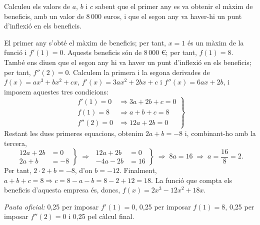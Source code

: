 \begin{apartats}
Calculeu els valors de $a$, $b$ i $c$ sabent que el primer any es va obtenir el màxim de beneficis, amb un
valor de 8\,000 euros, i que el segon any va haver-hi un punt d'inflexió en els beneficis.

\begin{solucio}
El primer any s'obté el màxim de beneficis; per tant, $x=1$ és un màxim de la funció i $f'(1)=0$. Aquests
beneficis són de 8\,000 €; per tant, $f(1)=8$. També ens diuen que el segon any hi va haver un punt d'inflexió
en els beneficis; per tant, $f''(2)=0$. Calculem la primera i la segona derivades de $f(x)=ax^3+bx^2+cx$,
$f'(x)=3ax^2+2bx+c$ i $f''(x)=6ax+2b$, i imposem aquestes tres condicions:
\[
\left.\begin{aligned}f'(1)=0&\Rightarrow3a+2b+c=0\\f(1)=8&\Rightarrow a+b+c=8\\f''(2)=0&\Rightarrow12a+2b=0\end{aligned}\right\}
\]
Restant les dues primeres equacions, obtenim $2a+b=-8$ i, combinant-ho amb la tercera,
\[
\left.\begin{aligned}12a+2b&=0\\2a+b&=-8\end{aligned}\right\}\;\Rightarrow\;
\left.\begin{aligned}12a+2b&=0\\-4a-2b&=16\end{aligned}\right\}\;\Rightarrow\;8a=16\;\Rightarrow\;a=\frac{16}{8}=2 .
\]
Per tant, $2\cdot2+b=-8$, d'on $b=-12$. Finalment, $a+b+c=8\Rightarrow c=8-a-b=8-2+12=18$. La funció que
compta els beneficis d'aquesta empresa és, doncs, $f(x)=2x^3-12x^2+18x$.

\textit{Pauta oficial:} 0,25 per imposar $f'(1)=0$, 0,25 per imposar $f(1)=8$, 0,25 per imposar $f''(2)=0$ i
0,25 pel càlcul final.
\end{solucio}

\end{apartats}

